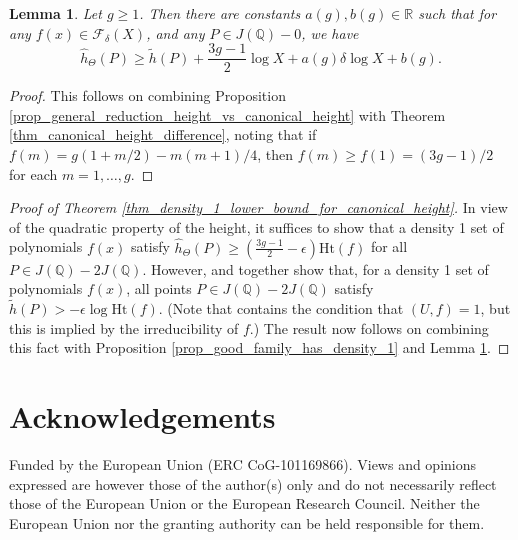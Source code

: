 \documentclass{article} %
\newtheorem{lemma}[proposition]{Lemma}
\numberwithin{equation}{section}
\newcommand{\R}{\mathbb{R}}
\newcommand{\Q}{\mathbb{Q}}
\newcommand{\height}{\mathrm{Ht}}
\begin{document}
\begin{lemma}\label{lem_second_lower_bound_on_canonical_height}
    Let $g \geq 1$. Then there are constants $a(g), b(g) \in \R$ such that for any  $f(x) \in \mathcal{F}_\delta(X)$, and any $P \in J(\Q) - 0$, we have
    \[ \widehat{h}_\Theta(P) \geq \widetilde{h}(P) + \frac{3g-1}{2}  \log X + a(g) \delta \log X + b(g).  \]
\end{lemma}
\begin{proof}
   This follows on combining Proposition \ref{prop_general_reduction_height_vs_canonical_height} with Theorem \ref{thm_canonical_height_difference}, noting that if $f(m) = g(1+m/2)-m(m+1)/4$, then $f(m) \geq f(1) = (3g-1)/2$ for each $m = 1, \dots, g$. 
\end{proof}
\begin{proof}[Proof of Theorem \ref{thm_density_1_lower_bound_for_canonical_height}]
    In view of the quadratic property of the height, it suffices to show that a density 1 set of polynomials $f(x)$ satisfy $\widehat{h}_\Theta(P) \geq \left(\frac{3g-1}{2} -\epsilon \right)\height(f)$ for all $P \in J(\Q) - 2 J(\Q)$. However, \cite[Corollary 3.11]{lagathorne2024smallheightoddhyperelliptic} and \cite[Theorem 4.10]{lagathorne2024smallheightoddhyperelliptic} together show that, for a density 1 set of polynomials $f(x)$, all points $P \in J(\Q) - 2 J(\Q)$ satisfy $\widetilde{h}(P) > - \epsilon \log \height(f)$. 
    (Note that \cite[Theorem 4.10]{lagathorne2024smallheightoddhyperelliptic} contains the condition that $(U, f) = 1$, but this is implied by the irreducibility of $f$.) 
    The result now follows on combining this fact with Proposition \ref{prop_good_family_has_density_1} and Lemma \ref{lem_second_lower_bound_on_canonical_height}.
\end{proof}

\section{Acknowledgements}

Funded by the European Union (ERC  CoG-101169866). Views and opinions expressed are however those of the author(s) only and do not necessarily reflect those of the European Union or the European Research Council. Neither the European Union nor the granting authority can be held responsible for them.





\end{document}
